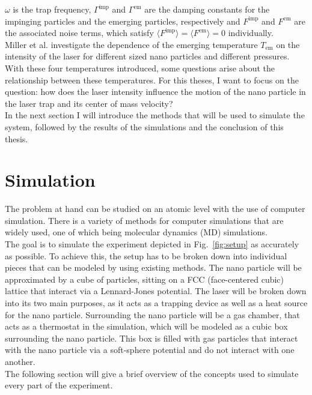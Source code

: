 \documentclass[12pt]{article}
\begin{document}
$\omega$ is the trap frequency, $\Gamma^\text{imp}$ and $\Gamma^\text{em}$ are the damping constants for the 
impinging particles and the emerging particles, respectively and $F^\text{imp}$ and $F^\text{em}$ are the associated noise terms, 
which satisfy $\langle F^\text{imp}\rangle= \langle F^\text{em} \rangle = 0$ individually.\\
Miller et al. investigate the dependence of the emerging temperature $T_\text{em}$ on the intensity of the laser for different sized nano particles
and different pressures.\\
With these four temperatures introduced, some questions arise about the relationship between these temperatures. For this theses, I want to focus on
the question: how does the laser intensity influence the motion of the nano particle in the laser trap and its center of mass velocity?\\
In the next section I will introduce the methods that will be used to simulate the system, followed by the results of the simulations and the
conclusion of this thesis.






\newpage
\section{Simulation}
The problem at hand can be studied on an atomic level with the use of computer simulation. There is a variety of methods for computer simulations
that are widely used, one of which being molecular dynamics (MD) simulations.\\ 
The goal is to simulate the experiment depicted in Fig.~\ref{fig:setup} as accurately as possible. To achieve this, the setup has to be broken down
into individual pieces that can be modeled by using existing methods. The nano particle will be approximated by a cube of particles, sitting on a FCC
(face-centered cubic) lattice that interact via a Lennard-Jones potential. The laser will be broken down into its two main purposes, 
as it acts as a trapping device as well as a heat source for the nano particle. Surrounding the nano particle will be a gas chamber, 
that acts as a thermostat in the simulation, which will be modeled as a cubic box surrounding the nano particle. 
This box is filled with gas particles that interact with the nano particle via a soft-sphere potential and do not interact with one another.\\
The following section will give a brief overview of the concepts used to simulate every part of the experiment.
\end{document}
